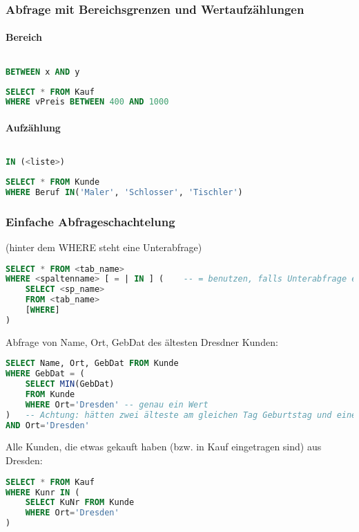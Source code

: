 \subsubsection{Abfrage mit Bereichsgrenzen und Wertaufzählungen}
\paragraph{Bereich} $ $
\begin{lstlisting}[language=SQL]
BETWEEN x AND y
\end{lstlisting}
\begin{lstlisting}[language=SQL]
SELECT * FROM Kauf
WHERE vPreis BETWEEN 400 AND 1000
\end{lstlisting}
\paragraph{Aufzählung} $ $
\begin{lstlisting}[language=SQL]
IN (<liste>)
\end{lstlisting}
\begin{lstlisting}[language=SQL]
SELECT * FROM Kunde
WHERE Beruf IN('Maler', 'Schlosser', 'Tischler')
\end{lstlisting}

\subsubsection{Einfache Abfrageschachtelung}
(hinter dem WHERE steht eine Unterabfrage)
\begin{lstlisting}[language=SQL]
SELECT * FROM <tab_name>
WHERE <spaltenname> [ = | IN ] (	-- = benutzen, falls Unterabfrage einzelnen Wert zurück gibt, IN-Operator benutzen, falls eine Wertliste durch Unterabfrage erzeugt wird
	SELECT <sp_name>
	FROM <tab_name>
	[WHERE]
)
\end{lstlisting}
Abfrage von Name, Ort, GebDat des ältesten Dresdner Kunden:
\begin{lstlisting}[language=SQL]
SELECT Name, Ort, GebDat FROM Kunde
WHERE GebDat = (
	SELECT MIN(GebDat)
	FROM Kunde
	WHERE Ort='Dresden'	-- genau ein Wert
)	-- Achtung: hätten zwei älteste am gleichen Tag Geburtstag und einer würde nicht aus Dresden kommen, dann würde diese mit angegeben. Also:
AND Ort='Dresden'
\end{lstlisting}
Alle Kunden, die etwas gekauft haben (bzw. in Kauf eingetragen sind) aus Dresden:
\begin{lstlisting}[language=SQL]
SELECT * FROM Kauf
WHERE Kunr IN (
	SELECT KuNr FROM Kunde
	WHERE Ort='Dresden'
)
\end{lstlisting}










